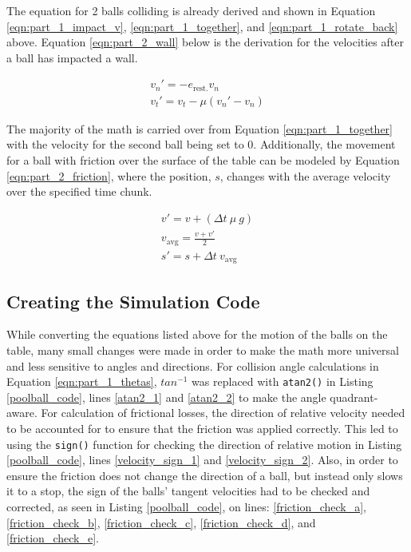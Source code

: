 \documentclass[12pt]{article}
\begin{document}
The equation for 2 balls colliding is already derived and shown in Equation \ref{eqn:part_1_impact_v}, \ref{eqn:part_1_together}, and \ref{eqn:part_1_rotate_back} above. Equation \ref{eqn:part_2_wall} below is the derivation for the velocities after a ball has impacted a wall.

\begin{equation}
    \label{eqn:part_2_wall}
    \begin{gathered}
        v_n' = - e_\text{rest.} v_n \\
        v_t' = v_t - \mu \left(v_n' - v_n\right)
    \end{gathered}
\end{equation}

The majority of the math is carried over from Equation \ref{eqn:part_1_together} with the velocity for the
second ball being set to 0. Additionally, the movement for a ball with friction over the surface of the table
can be modeled by Equation \ref{eqn:part_2_friction}, where the position, $s$, changes with the average
velocity over the specified time chunk.

\begin{equation}
    \label{eqn:part_2_friction}
    \begin{gathered}
        v' = v + (\Delta t \ \mu \ g)\\
        v_\text{avg} = \frac{v + v'}{2}\\
        s' = s + \Delta t \ v_\text{avg}
    \end{gathered}
\end{equation}

\subsection{Creating the Simulation Code}

While converting the equations listed above for the motion of the balls on the table, many small changes were made in order to make the math more universal and less sensitive to angles and directions. For collision angle calculations in Equation \ref{eqn:part_1_thetas}, $tan^{-1}$ was replaced with \lstinline{atan2()} in Listing \ref{poolball_code}, lines \ref{atan2_1} and \ref{atan2_2} to make the angle quadrant-aware. For calculation of frictional losses, the direction of relative velocity needed to be accounted for to ensure that the friction was applied correctly. This led to using the \lstinline{sign()} function for checking the direction of relative motion in Listing \ref{poolball_code}, lines \ref{velocity_sign_1} and \ref{velocity_sign_2}. Also, in order to ensure the friction does not change the direction of a ball, but instead only slows it to a stop, the sign of the balls' tangent velocities had to be checked and corrected, as seen in Listing \ref{poolball_code}, on lines: \ref{friction_check_a}, \ref{friction_check_b}, \ref{friction_check_c}, \ref{friction_check_d}, and \ref{friction_check_e}.
\end{document}
